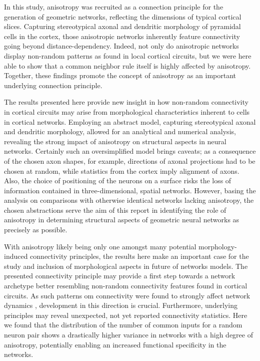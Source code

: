 In this study, anisotropy was recruited as a connection principle for
the generation of geometric networks, reflecting the dimensions of
typical cortical slices. Capturing stereotypical axonal and dendritic
morphology of pyramidal cells in the cortex, those anisotropic
networks inherently feature connectivity going beyond
distance-dependency. Indeed, not only do anisotropic networks display
non-random patterns as found in local cortical circuits, but we were
here able to show that a common neighbor rule itself is highly
affected by anisotropy. Together, these findings promote the concept
of anisotropy as an important underlying connection principle.

The results presented here provide new insight in how non-random
connectivity in cortical circuits may arise from morphological
characteristics inherent to cells in cortical networks. Employing an
abstract model, capturing stereotypical axonal and dendritic
morphology, allowed for an analytical and numerical analysis, revealing
the strong impact of anisotropy on structural aspects in neural
networks. Certainly such an oversimplified model brings caveats; as a
consequence of the chosen axon shapes, for example, directions of
axonal projections had to be chosen at random, while statistics from
the cortex imply alignment of axons. Also, the choice of positioning
of the neurons on a surface risks the loss of information contained in
three-dimensional, spatial networks. However, basing the analysis on
comparisons with otherwise identical networks lacking anisotropy, the
chosen abstractions serve the aim of this report in identifying the
role of anisotropy in determining structural aspects of geometric
neural networks as precisely as possible.

With anisotropy likely being only one amongst many potential
morpho\-logy-induced connectivity principles, the results here make an
important case for the study and inclusion of morphological aspects in
future of networks models. The presented connectivity principle may
provide a first step towards a network archetype better resembling
non-random connectivity features found in cortical circuits. As such
patterns om connectivity were found to strongly affect network
dynamics \parencite{Pernice2011, Zhao2011}, development in this
direction is crucial. Furthermore, underlying principles may reveal
unexpected, not yet reported connectivity statistics. Here we found
that the distribution of the number of common inputs for a random
neuron pair shows a drastically higher variance in networks with a
high degree of anisotropy, potentially enabling an increased
functional specificity in the networks.

